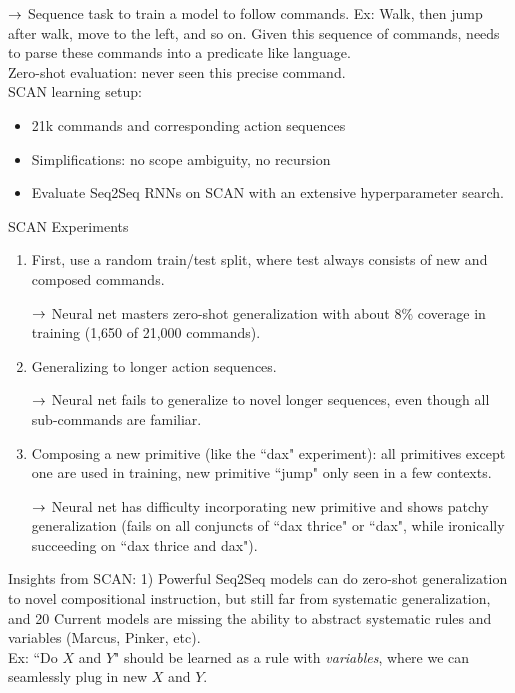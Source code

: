 $\rightarrow$ Sequence task to train a model to follow commands. Ex: Walk, then jump after walk, move to the left, and so on. Given this sequence of commands, needs to parse these commands into a predicate like language. \\

Zero-shot evaluation: never seen this precise command. \\

SCAN learning setup:
\begin{itemize}
    \item 21k commands and corresponding action sequences
    \item Simplifications: no scope ambiguity, no recursion
    \item Evaluate Seq2Seq RNNs on SCAN with an extensive hyperparameter search.
\end{itemize}

SCAN Experiments
\begin{enumerate}
    \item First, use a random train/test split, where test always consists of new and composed commands.

$\rightarrow$ Neural net masters zero-shot generalization with about 8\% coverage in training (1,650 of 21,000 commands).

\item Generalizing to longer action sequences.

    $\rightarrow$ Neural net fails to generalize to novel longer sequences, even though all sub-commands are familiar.

\item Composing a new primitive (like the ``dax" experiment): all primitives except one are used in training, new primitive ``jump" only seen in a few contexts.

$\rightarrow$ Neural net has difficulty incorporating new primitive and shows patchy generalization (fails on all conjuncts of ``dax thrice" or ``dax", while ironically succeeding on ``dax thrice and dax").
\end{enumerate}

Insights from SCAN: 1) Powerful Seq2Seq models can do zero-shot generalization to novel compositional instruction, but still far from systematic generalization, and 20 Current models are missing the ability to abstract systematic rules and variables (Marcus, Pinker, etc). \\

Ex: ``Do $X$ and $Y$" should be learned as a rule with {\it variables}, where we can seamlessly plug in new $X$ and $Y$. \\

